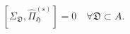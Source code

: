 \documentclass[12font]{article}
\theoremstyle{definition}
\newcommand{\lr}[1]{\left(  #1  \right)}
\newcommand{\mrm}[1]{\mathrm{#1}}
\newcommand{\Tr}{\mrm{Tr}}
\begin{document}
\[
[\Sigma_\mathfrak{D}, \hat{\Pi}_\mathfrak{H}^{(s)}] = 0\quad \forall \mathfrak{D}\subset A.
\]


\end{document}
